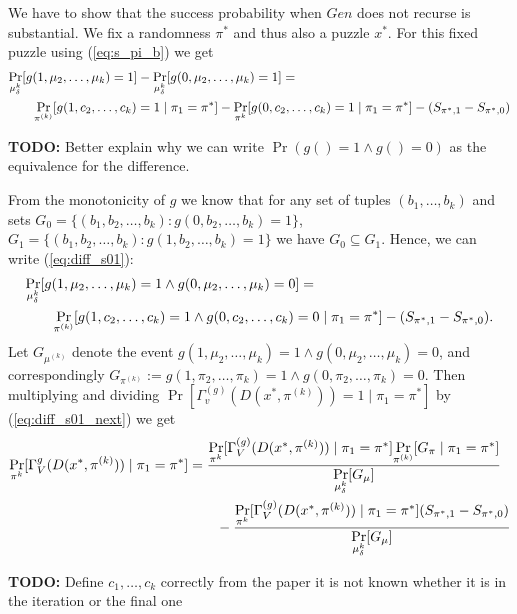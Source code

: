 We have to show that the success probability when $Gen$ does not recurse is substantial.
We fix a randomness $\pi^*$ and thus also a puzzle $x^*$. For this fixed puzzle using (\ref{eq:s_pi_b}) we get
\begin{align}
\label{eq:diff_s01}
  &\underset{\mu_{\delta}^k}{\Pr}[g(1, \mu_2, \dots, \mu_k)=1] - \underset{\mu_{\delta}^k}{\Pr}[g(0, \mu_2, \dots, \mu_k)=1] = \notag\\
&\mbox\qquad  \underset{\pi^{(k)}}{\Pr}[g(1, c_2, \dots, c_k) =1 \mid \pi_1 = \pi^*] - \underset{\pi^k}{\Pr}[g(0, c_2, \dots, c_k) = 1 \mid \pi_1 = \pi^*] - (S_{\pi^*,1} - S_{\pi^*,0})
\end{align}
\begin{todo}
  \textbf{TODO:} Better explain why we can write $\Pr(g() = 1 \land g() = 0)$ as the equivalence for the difference.
\end{todo}
From the monotonicity of $g$ we know that for any set of tuples $(b_1, \dots, b_k)$
and sets $G_0 = \{ (b_1, b_2, \dots, b_k): g(0, b_2, \dots, b_k) = 1\}$, $ G_1 = \{(b_1, b_2, \dots, b_k) : g(1, b_2, \dots, b_k) = 1 \}$
we have $G_0 \subseteq G_1$. Hence, we can write (\ref{eq:diff_s01}):
\begin{align}
  \label{eq:diff_s01_next}
  &\underset{\mu_{\delta}^k}{\Pr}[g(1, \mu_2, \dots, \mu_k) = 1 \land g(0, \mu_2, \dots, \mu_k) = 0] = \notag\\
&\mbox\qquad  \underset{\pi^{(k)}}{\Pr}[g(1, c_2, \dots, c_k) = 1 \land g(0, c_2, \dots, c_k) = 0 \mid \pi_1 = \pi^*] - (S_{\pi^*,1} - S_{\pi^*,0}).
\end{align}
Let $G_{\mu^{(k)}}$ denote the event $g(1, \mu_2, \dots, \mu_k) = 1 \land g(0, \mu_2, \dots, \mu_k) = 0$, and correspondingly
$G_{\pi^{(k)}} := g(1, \pi_2, \dots, \pi_k) = 1 \land g(0, \pi_2, \dots, \pi_k) = 0$.
Then multiplying and dividing $\underset{}{\Pr}[\Gamma_v^{(g)}(D(x^*, \pi^{(k)})) = 1 \mid \pi_1 = \pi^*]$ by (\ref{eq:diff_s01_next}) we get
\begin{align}
  \underset{\pi^{k}}{\Pr}[\Gamma_V^{g}(D(x^*, \pi^{(k)})) \mid \pi_1 = \pi^*] &=
  \frac{\underset{\pi^{k}}{\Pr}[\Gamma_V^{(g)}(D(x^*, \pi^{(k)})) \mid \pi_1 = \pi^*] \underset{\pi^{(k)}}{\Pr}[G_{\pi} \mid \pi_1 = \pi^*]} {\underset{\mu_{\delta}^{k}}{\Pr}[G_{\mu}]} \notag\\
  & \mbox\qquad - \frac{\underset{\pi^{k}}{\Pr}[\Gamma_V^{(g)}(D(x^*, \pi^{(k)})) \mid \pi_1 = \pi^*](S_{\pi^*,1} - S_{\pi^*,0})}{\underset{\mu_{\delta}^{k}}{\Pr}[G_{\mu}]}
\end{align}
\begin{todo}
  \textbf{TODO:} Define $c_1, \dots, c_k$ correctly from the paper it is not known whether it is in the iteration or the final one
\end{todo}



